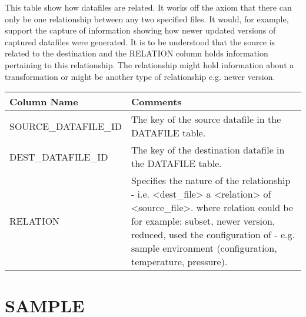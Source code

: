 \documentclass{report}
\begin{document}
This table show how datafiles are related. It works off the axiom that there can only be one relationship between any two specified files. It would, for example, support the capture of information showing how newer updated versions of captured datafiles were generated. It is to be understood that the source is related to the destination and the RELATION column holds information pertaining to this relationship. The relationship might hold information about a transformation or might be another type of relationship e.g. newer version.\\

\begin{tabular}{|l|l|}
\hline
Column Name & Comments \\ \hline
SOURCE\_DATAFILE\_ID & \multicolumn{1}{p{100mm}|}{
The key of the source datafile in the DATAFILE table.} \\ \hline
DEST\_DATAFILE\_ID & \multicolumn{1}{p{100mm}|}{
The key of the destination datafile in the DATAFILE table.} \\ \hline
RELATION & \multicolumn{1}{p{100mm}|}{
Specifies the nature of the relationship - i.e. \textless{}dest\_file\textgreater{} a \textless{}relation\textgreater{} of \textless{}source\_file\textgreater{}. where relation could be for example: subset, newer version, reduced, used the configuration of - e.g. sample environment (configuration, temperature, pressure).} \\ \hline
\end{tabular}
\section{SAMPLE}
\end{document}
